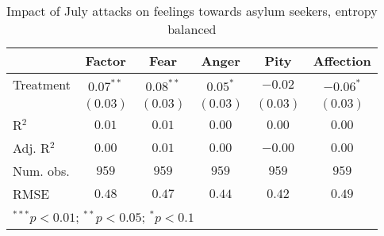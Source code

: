 
\begin{table}
\caption{Impact of July attacks on feelings towards asylum seekers, entropy balanced}
\begin{center}
\begin{tabular}{l c c c c c}
\toprule
 & Factor & Fear & Anger & Pity & Affection \\
\midrule
Treatment  & $0.07^{**}$ & $0.08^{**}$ & $0.05^{*}$ & $-0.02$  & $-0.06^{*}$ \\
           & $(0.03)$    & $(0.03)$    & $(0.03)$   & $(0.03)$ & $(0.03)$    \\
\midrule
R$^2$      & $0.01$      & $0.01$      & $0.00$     & $0.00$   & $0.00$      \\
Adj. R$^2$ & $0.00$      & $0.01$      & $0.00$     & $-0.00$  & $0.00$      \\
Num. obs.  & $959$       & $959$       & $959$      & $959$    & $959$       \\
RMSE       & $0.48$      & $0.47$      & $0.44$     & $0.42$   & $0.49$      \\
\bottomrule
\multicolumn{6}{l}{\scriptsize{$^{***}p<0.01$; $^{**}p<0.05$; $^{*}p<0.1$}}
\end{tabular}
\label{tab_emo_match}
\end{center}
\end{table}

